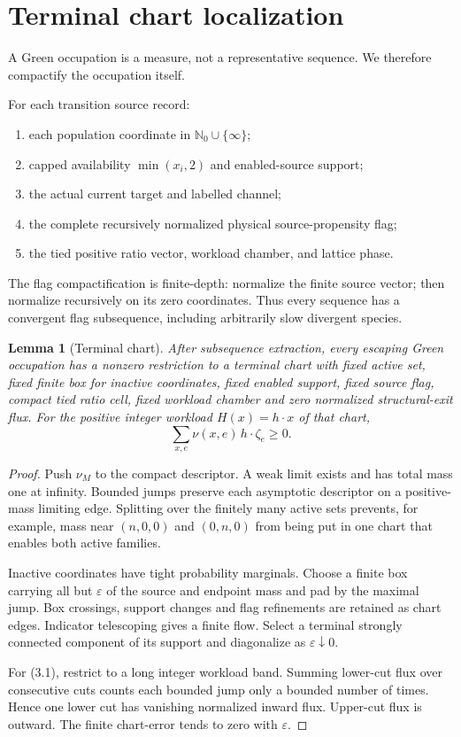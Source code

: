 \documentclass[11pt]{article}
\newtheorem{lemma}[theorem]{Lemma}
\newcommand{\N}{\mathbb N_0}
\begin{document}
\section{Terminal chart localization}

A Green occupation is a measure, not a representative sequence.  We
therefore compactify the occupation itself.

For each transition source record:
\begin{enumerate}[label=(\roman*)]
\item each population coordinate in \(\N\cup\{\infty\}\);
\item capped availability \(\min(x_i,2)\) and enabled-source support;
\item the actual current target and labelled channel;
\item the complete recursively normalized physical source-propensity flag;
\item the tied positive ratio vector, workload chamber, and lattice phase.
\end{enumerate}
The flag compactification is finite-depth: normalize the finite source vector;
then normalize recursively on its zero coordinates.  Thus every sequence has
a convergent flag subsequence, including arbitrarily slow divergent species.

\begin{lemma}[Terminal chart]\label{lem:chart}
After subsequence extraction, every escaping Green occupation has a nonzero
restriction to a terminal chart with fixed active set, fixed finite box for
inactive coordinates, fixed enabled support, fixed source flag, compact tied
ratio cell, fixed workload chamber and zero normalized structural-exit flux.
For the positive integer workload \(H(x)=h\cdot x\) of that chart,
\[
 \sum_{x,e}\nu(x,e)\,h\cdot\zeta_e\ge0.       \tag{3.1}
\]
\end{lemma}

\begin{proof}
Push \(\nu_M\) to the compact descriptor.  A weak limit exists and has total
mass one at infinity.  Bounded jumps preserve each asymptotic descriptor on
a positive-mass limiting edge.  Splitting over the finitely many active sets
prevents, for example, mass near \((n,0,0)\) and \((0,n,0)\) from being put
in one chart that enables both active families.

Inactive coordinates have tight probability marginals.  Choose a finite box
carrying all but \(\varepsilon\) of the source and endpoint mass and pad by
the maximal jump.  Box crossings, support changes and flag refinements are
retained as chart edges.  Indicator telescoping gives a finite flow.  Select
a terminal strongly connected component of its support and diagonalize as
\(\varepsilon\downarrow0\).

For (3.1), restrict to a long integer workload band.  Summing lower-cut flux
over consecutive cuts counts each bounded jump only a bounded number of
times.  Hence one lower cut has vanishing normalized inward flux.  Upper-cut
flux is outward.  The finite chart-error tends to zero with \(\varepsilon\).
\end{proof}
\end{document}
